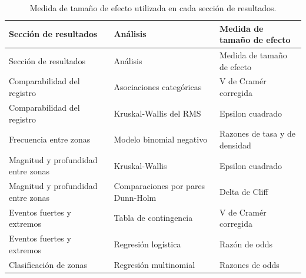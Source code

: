 \documentclass[
  spanish,
  letterpaper,
  DIV=11,
  numbers=noendperiod]{scrartcl}
\begin{document}
\begin{longtable}[]{@{}
  >{\raggedright\arraybackslash}p{}
  >{\raggedright\arraybackslash}p{}
  >{\raggedright\arraybackslash}p{}@{}}
\caption{Medida de tamaño de efecto utilizada en cada sección de
resultados.}\label{tbl-medidas-efecto}\tabularnewline
\toprule\noalign{}
\begin{minipage}[b]{\linewidth}\raggedright
Sección de resultados
\end{minipage} & \begin{minipage}[b]{\linewidth}\raggedright
Análisis
\end{minipage} & \begin{minipage}[b]{\linewidth}\raggedright
Medida de tamaño de efecto
\end{minipage} \\
\midrule\noalign{}
\endfirsthead
\toprule\noalign{}
\begin{minipage}[b]{\linewidth}\raggedright
Sección de resultados
\end{minipage} & \begin{minipage}[b]{\linewidth}\raggedright
Análisis
\end{minipage} & \begin{minipage}[b]{\linewidth}\raggedright
Medida de tamaño de efecto
\end{minipage} \\
\midrule\noalign{}
\endhead
\bottomrule\noalign{}
\endlastfoot
Comparabilidad del registro & Asociaciones categóricas & V de Cramér
corregida \\
Comparabilidad del registro & Kruskal-Wallis del RMS & Epsilon
cuadrado \\
Frecuencia entre zonas & Modelo binomial negativo & Razones de tasa y de
densidad \\
Magnitud y profundidad entre zonas & Kruskal-Wallis & Epsilon
cuadrado \\
Magnitud y profundidad entre zonas & Comparaciones por pares Dunn-Holm &
Delta de Cliff \\
Eventos fuertes y extremos & Tabla de contingencia & V de Cramér
corregida \\
Eventos fuertes y extremos & Regresión logística & Razón de odds \\
Clasificación de zonas & Regresión multinomial & Razones de odds \\
\end{longtable}
\end{document}
